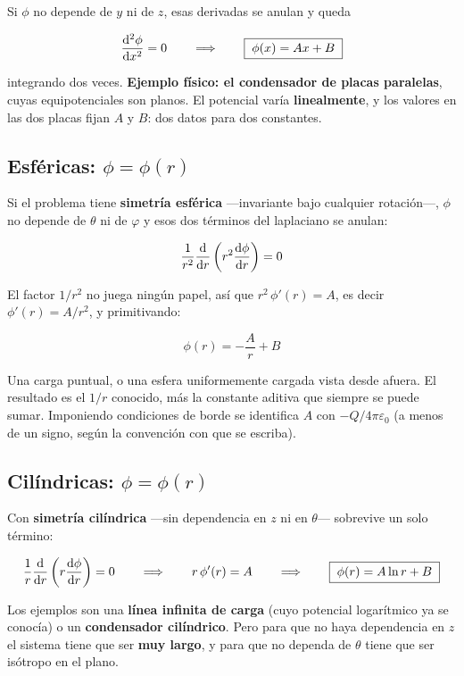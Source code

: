 \documentclass[12pt,a4paper]{article}
\begin{document}
Si $\phi$ no depende de $y$ ni de $z$, esas derivadas se anulan y queda

\[
\dv[2]{\phi}{x} = 0 \qquad\Longrightarrow\qquad \boxed{\;\phi(x) = A x + B\;}
\]

integrando dos veces. \textbf{Ejemplo físico: el condensador de placas
paralelas}, cuyas equipotenciales son planos. El potencial varía
\textbf{linealmente}, y los valores en las dos placas fijan $A$ y $B$: dos datos
para dos constantes.

\subsection{Esféricas: \texorpdfstring{$\phi = \phi(r)$}{phi = phi(r)}}

Si el problema tiene \textbf{simetría esférica} ---invariante bajo cualquier
rotación---, $\phi$ no depende de $\theta$ ni de $\varphi$ y esos dos términos del
laplaciano se anulan:

\[
\frac{1}{r^2}\dv{r}\left(r^2\dv{\phi}{r}\right) = 0
\]

El factor $1/r^2$ no juega ningún papel, así que $r^2\,\phi'(r) = A$, es decir
$\phi'(r) = A/r^2$, y primitivando:

\[
\boxed{\;\phi(r) = -\frac{A}{r} + B\;}
\]

\begin{notebox}[Ejemplos]
Una carga puntual, o una esfera uniformemente cargada vista desde afuera. El
resultado es el $1/r$ conocido, más la constante aditiva que siempre se puede
sumar. Imponiendo condiciones de borde se identifica $A$ con
$-Q/4\pi\varepsilon_0$ (a menos de un signo, según la convención con que se
escriba).
\end{notebox}

\subsection{Cilíndricas: \texorpdfstring{$\phi = \phi(r)$}{phi = phi(r)}}

Con \textbf{simetría cilíndrica} ---sin dependencia en $z$ ni en $\theta$---
sobrevive un solo término:

\[
\frac{1}{r}\dv{r}\left(r\dv{\phi}{r}\right) = 0
\qquad\Longrightarrow\qquad
r\,\phi'(r) = A
\qquad\Longrightarrow\qquad
\boxed{\;\phi(r) = A\ln r + B\;}
\]

\begin{warnbox}
Los ejemplos son una \textbf{línea infinita de carga} (cuyo potencial logarítmico
ya se conocía) o un \textbf{condensador cilíndrico}. Pero para que no haya
dependencia en $z$ el sistema tiene que ser \textbf{muy largo}, y para que no
dependa de $\theta$ tiene que ser isótropo en el plano.
\end{warnbox}
\end{document}
